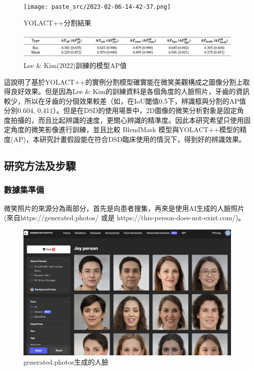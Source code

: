 \begin{figure}[H]
\centering
\texttt{[image: paste\_src/2023-02-06-14-42-37.png]}
\caption{YOLACT++分割結果}
\label{}
\end{figure}

\begin{figure}[H]
  \centering
  \includegraphics[width=1\textwidth]{paste_src/2023-02-07-22-15-13.png}
  \caption{Lee \& Kim(2022)訓練的模型AP值}
  \label{fig:rt}
  \end{figure}


這說明了基於YOLACT++的實例分割模型確實能在微笑美觀構成之圖像分割上取得良好效果。但是因為Lee \& Kim的訓練資料是各個角度的人臉照片，牙齒的資訊較少，所以在牙齒的分個效果較差（如，在IoU閾值0.5下，辨識框與分割的AP值分別0.604, 0.411）。但是在DSD的使用場景中，2D圖像的微笑分析對象是固定角度拍攝的，而且比起辨識的速度，更關心辨識的精準度。因此本研究希望只使用固定角度的微笑影像進行訓練，並且比較 BlendMask 模型與YOLACT++模型的精度(AP)，本研究計畫假設能在符合DSD臨床使用的情況下，得到好的辨識效果。




\subsection{研究方法及步驟}

\subsubsection{數據集準備}
微笑照片的來源分為兩部分，首先是向患者搜集，再來是使用AI生成的人臉照片(來自https://generated.photos/ 或是 https://this-person-does-not-exist.com/)。




\begin{figure}[H]
\centering
  \includegraphics[width=.8\textwidth]{paste_src/2023-02-07-18-59-47.png}
\caption{generated.photos生成的人臉}
\label{}
\end{figure}

